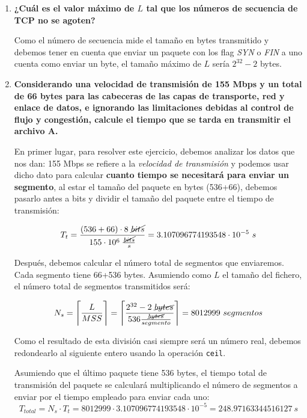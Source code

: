 \documentclass[10pt,a4paper,spanish]{report}
\begin{document}
\begin{enumerate}[\bf a)]
  \item \textbf{¿Cuál es el valor máximo de $L$ tal que los números de secuencia de TCP no se agoten?}

  Como el número de secuencia mide el tamaño en bytes transmitido y debemos tener en cuenta que enviar un paquete con los flag \textit{\textcolor{tema3}{SYN}} o \textcolor{tema3}{\textit{FIN}} a uno cuenta como enviar un byte, el tamaño máximo de $L$ sería $2^{32} - 2$ bytes.  

  \item \textbf{Considerando una velocidad de transmisión de 155 Mbps y un total de 66 bytes para las cabeceras de las capas de transporte, red y enlace de datos, e ignorando las limitaciones debidas al control de flujo y congestión, calcule el tiempo que se tarda en transmitir el archivo A.}

  En primer lugar, para resolver este ejercicio, debemos analizar los datos que nos dan: 155 Mbps se refiere a la \textit{\textcolor{tema3}{velocidad de transmisión}} y podemos usar dicho dato para calcular \textbf{\textcolor{tema3}{cuanto tiempo se necesitará para enviar un segmento}}, al estar el tamaño del paquete en bytes (536+66), debemos pasarlo antes a bits y dividir el tamaño del paquete entre el tiempo de transmisión:

  \begin{displaymath}
    T_t = \frac{(536+66) \cdot 8 ~\cancel{bits}}{155 \cdot 10^6 ~\frac{\cancel{bits}}{s}} = 3.107096774193548 \cdot 10^{-5} ~ s
  \end{displaymath}

  Después, debemos calcular el número total de segmentos que enviaremos. Cada segmento tiene 66+536 bytes. Asumiendo como $L$ el tamaño del fichero, el número total de segmentos transmitidos será:

  \begin{displaymath}
  N_s = \Bigg\lceil \frac{L}{MSS} \Bigg\rceil = \Bigg\lceil \frac{2^{32}-2 ~\cancel{bytes}}{536 \frac{\cancel{bytes}}{segmento}} \Bigg\rceil = 8012999 ~segmentos
  \end{displaymath}

  Como el resultado de esta división casi siempre será un número real, debemos redondearlo al siguiente entero usando la operación \texttt{ceil}.

  Asumiendo que el último paquete tiene 536 bytes, el tiempo total de transmisión del paquete se calculará multiplicando el número de segmentos a enviar por el tiempo empleado para enviar cada uno:
  \begin{displaymath}
    T_{total} = N_s \cdot T_t = 8012999 \cdot 3.107096774193548 \cdot 10^{-5} = 248.97163344516127 ~s
  \end{displaymath}


\end{enumerate}
\end{document}
